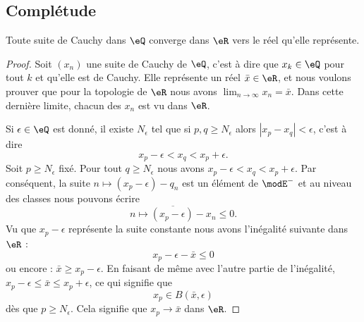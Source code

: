 \subsection{Complétude}

\begin{lemma}      \label{LemooRTGFooYVstwS}
    Toute suite de Cauchy dans \( \eQ\) converge dans \( \eR\) vers le réel qu'elle représente.
\end{lemma}

\begin{proof}
    Soit \( (x_n)\) une suite de Cauchy de \( \eQ\), c'est à dire que \( x_k\in \eQ\) pour tout \( k\) et qu'elle est de Cauchy. Elle représente un réel \( \bar x\in \eR\), et nous voulons prouver que pour la topologie de \( \eR\) nous avons \( \lim_{n\to \infty} x_n=\bar x\). Dans cette dernière limite, chacun des \( x_n\) est vu dans \( \eR\).


    Si \( \epsilon\in \eQ\) est donné, il existe \( N_{\epsilon}\) tel que si \( p,q\geq N_{\epsilon}\) alors \( | x_p-x_q |< \epsilon\), c'est à dire
    \begin{equation}
        x_p-\epsilon<x_q<x_p+\epsilon.
    \end{equation}
    Soit \( p\geq N_{\epsilon}\) fixé. Pour tout \( q\geq N_{\epsilon}\) nous avons \(  x_p-\epsilon<x_q<x_p+\epsilon \). Par conséquent, la suite \( n\mapsto (x_p-\epsilon)-q_n\) est un élément de \( \modE^-\) et au niveau des classes nous pouvons écrire
    \begin{equation}
        \overline{ n\mapsto (x_p-\epsilon)-x_n }\leq 0.
    \end{equation}
    Vu que \( x_p-\epsilon\) représente la suite constante nous avons l'inégalité suivante dans \( \eR\) :
    \begin{equation}
        x_p-\epsilon-\bar x\leq 0
    \end{equation}
    ou encore : \( \bar x\geq x_p-\epsilon\). En faisant de même avec l'autre partie de l'inégalité, \( x_p-\epsilon\leq \bar x\leq x_p+\epsilon\), ce qui signifie que
    \begin{equation}
        x_p\in B(\bar x,\epsilon)
    \end{equation}
    dès que \( p\geq N_{\epsilon}\). Cela signifie que \( x_p\to \bar x\) dans \( \eR\).
\end{proof}

